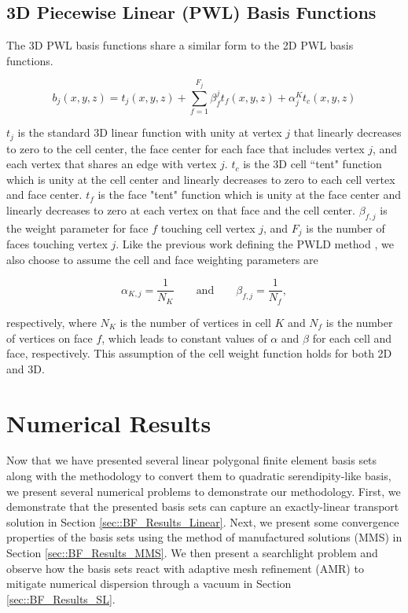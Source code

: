 \subsection{3D Piecewise Linear (PWL) Basis Functions}
\label{sec::BF_3DLinear_PWL}

The 3D PWL basis functions share a similar form to the 2D PWL basis functions.

\begin{equation}
\label{eq::PWL_3D}
	b_j (x,y,z)  = t_j  (x,y,z) + \sum_{f=1}^{F_j} \beta_f^j  t_f (x,y,z) + \alpha_j^K t_c  (x,y,z)
\end{equation}

\noindent $t_j$ is the standard 3D linear function with unity at vertex $j$ that linearly decreases to zero to the cell center, the face center for each face that includes vertex $j$, and each vertex that shares an edge with vertex $j$. $t_c$ is the 3D cell ``tent" function which is unity at the cell center and linearly decreases to zero to each cell vertex and face center. $t_f$ is the face "tent" function which is unity at the face center and linearly decreases to zero at each vertex on that face and the cell center. $\beta_{f,j}$ is the weight parameter for face $f$ touching cell vertex $j$, and $F_j$ is the number of faces touching vertex $j$. Like the previous work defining the PWLD method \cite{bailey2008phd}, we also choose to assume the cell and face weighting parameters are

\begin{equation}
\alpha_{K,j} = \frac{1}{N_K} \qquad \text{and} \qquad \beta_{f,j} = \frac{1}{N_f},
\label{eq::PWL_weight_vals}
\end{equation}

\noindent respectively, where $N_K$ is the number of vertices in cell $K$ and $N_f$ is the number of vertices on face $f$, which leads to constant values of $\alpha$ and $\beta$ for each cell and face, respectively. This assumption of the cell weight function holds for both 2D and 3D.

\section{Numerical Results}
\label{sec::BF_Results}

Now that we have presented several linear polygonal finite element basis sets along with the methodology to convert them to quadratic serendipity-like basis, we present several numerical problems to demonstrate our methodology. First, we demonstrate that the presented basis sets can capture an exactly-linear transport solution in Section \ref{sec::BF_Results_Linear}. Next, we present some convergence properties of the basis sets using the method of manufactured solutions (MMS) in Section \ref{sec::BF_Results_MMS}. We then present a searchlight problem and observe how the basis sets react with adaptive mesh refinement (AMR) to mitigate numerical dispersion through a vacuum in Section \ref{sec::BF_Results_SL}.

